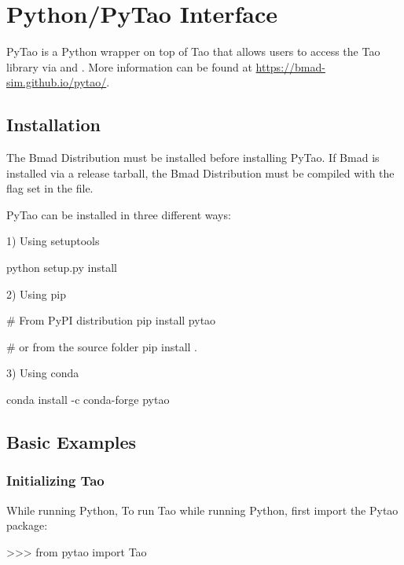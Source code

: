 \documentclass{hitec}     %
\begin{document}
{{{{%
\appendix

\section{Python/PyTao Interface}

PyTao is a Python wrapper on top of Tao that allows users to access the Tao library via  and . More information can be found at \url{https://bmad-sim.github.io/pytao/}.

\subsection{Installation}

The Bmad Distribution must be installed before installing PyTao. If Bmad is installed via a release tarball, the Bmad Distribution must be compiled with the  flag set in the  file. 

PyTao can be installed in three different ways:

1) Using setuptools
\begin{code}
python setup.py install
\end{code}

2) Using pip
\begin{code}
# From PyPI distribution
pip install pytao

# or from the source folder
pip install .

\end{code}

3) Using conda
\begin{code}
conda install -c conda-forge pytao
\end{code}

\subsection{Basic Examples}

\subsubsection{Initializing Tao}
While running Python,
To run Tao while running Python, first import the Pytao package:
\begin{code}
>>> from pytao import Tao
\end{code}

}}}}
\end{document}
